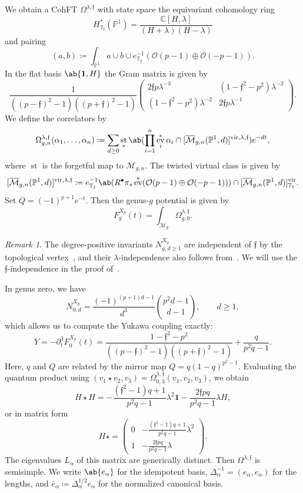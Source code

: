 \documentclass{amsart}
\theoremstyle{definition}
\theoremstyle{remark}
\newtheorem{rmk}[thm]{Remark}
\theoremstyle{plain}
\theoremstyle{definition}
\theoremstyle{remark}
\newcommand{\C}{\mathbb{C}}
\renewcommand{\P}{\mathbb{P}}
\newcommand{\Mbar}{\overline{\mathcal{M}}}
\newcommand{\mc}[1]{\mathcal{#1}}
\newcommand{\T}{\mathbb{T}}
\newcommand{\mf}[1]{\mathfrak{#1}}
\newcommand{\mr}[1]{\mathrm{#1}}
\newcommand{\1}{\mathbf{1}}
\newcommand{\2}{\mathbf{2}}
\newcommand{\3}{\mathbf{3}}
\newcommand{\vir}{\mr{vir}}
\DeclareMathOperator{\ev}{ev}
\DeclareMathOperator{\st}{st}
\begin{document}
We obtain a CohFT \(\Omega^{\lambda,\mf{f}}\) with state space the equivariant cohomology ring
\[ H^*_{\T_{\mf{f}}}(\P^1) = \frac{\C[H,\lambda]}{(H+\lambda)(H-\lambda)} \]
and pairing
\[ (a,b) \coloneqq \int_{\P^1} a \cup b \cup e^{-1}_{\T_{\mf{f}}}(\mc{O}(p-1)\oplus\mc{O}(-p-1)). \]
In the flat basis \(\ab\{\1,H\}\) the Gram matrix is given by
\[ \frac{1}{((p-\mf{f})^2-1)((p+\mf{f})^2-1)}\begin{pmatrix} 2\mf{f}p\lambda^{-3} & (1-\mf{f}^2-p^2)\lambda^{-2} \\ (1-\mf{f}^2-p^2)\lambda^{-2} & 2\mf{f}p\lambda^{-1} \end{pmatrix}. \]
We define the correlators by
\[ \Omega^{\lambda,\mf{f}}_{g,n}(\alpha_1,\ldots,\alpha_n) \coloneqq \sum_{d\geq0}\st_*\ab(\prod_{i=1}^n \ev_i^*\alpha_i \cap [\Mbar_{g,n}(\P^1,d)]^{\vir,\lambda,\mf{f}})e^{-dt}, \]
where \(\st\) is the forgetful map to \(\Mbar_{g,n}\). The twisted virtual class is given by
\[ [\Mbar_{g,n}(\P^1,d)]^{\vir,\lambda,\mf{f}} \coloneqq e^{-1}_{\T_{\mf{f}}}\ab(R^{\bullet}\pi_*\ev^*(\mc{O}(p-1)\oplus\mc{O}(-p-1))) \cap [\Mbar_{g,n}(\P^1,d)]^{\vir}_{\T_{\mf{f}}}. \]
Set \(Q = (-1)^{p+1}e^{-t}\). Then the genus-\(g\) potential is given by
\[ F^{X_p}_g(t) = \int_{\Mbar_g} \Omega^{\lambda,\mf{f}}_{g,0}. \]

\begin{rmk}
    The degree-positive invariants \(N^{X_p}_{g,d\geq1}\) are independent of \(\mf{f}\) by the topological vertex~\cite{LLLZ2009}, and their \(\lambda\)-independence also follows from~. We will use the \(\mf{f}\)-independence in the proof of~.
\end{rmk}

In genus zero, we have
\[ N^{X_p}_{0,d} = \frac{(-1)^{(p+1)d-1}}{d^3}\binom{p^2d-1}{d-1}, \qquad d \geq 1, \]
which allows us to compute the Yukawa coupling exactly:
\[ Y = -\partial_t^3 F_0^{X_p}(t) = \frac{1-\mf{f}^2-p^2}{((p-\mf{f})^2-1)((p+\mf{f})^2-1)} + \frac{q}{p^2q-1}. \]
Here, \(q\) and \(Q\) are related by the mirror map \(Q = q(1-q)^{p^2-1}\). Evaluating the quantum product using \((v_1 \star v_2, v_3) = \Omega^{\lambda,\mf{f}}_{0,3}(v_1,v_2,v_3)\), we obtain
\[ H \star H = -\frac{(\mf{f}^2-1)q+1}{p^2q-1}\lambda^2 \1 - \frac{2\mf{f}pq}{p^2q-1}\lambda H, \]
or in matrix form
\[ H \star = \begin{pmatrix} 0 & -\frac{(\mf{f}^2-1)q+1}{p^2q-1}\lambda^2 \\ 1 & -\frac{2\mf{f}pq}{p^2q-1}\lambda \end{pmatrix}. \]
The eigenvalues \(L_{\alpha}\) of this matrix are generically distinct. Then \(\Omega^{\lambda,\mf{f}}\) is semisimple. We write \(\ab\{e_{\alpha}\}\) for the idempotent basis, \(\Delta_{\alpha}^{-1} = (e_{\alpha},e_{\alpha})\) for the lengths, and \(\bar{e}_{\alpha} \coloneqq \Delta_{\alpha}^{1/2}e_{\alpha}\) for the normalized canonical basis.
\end{document}
